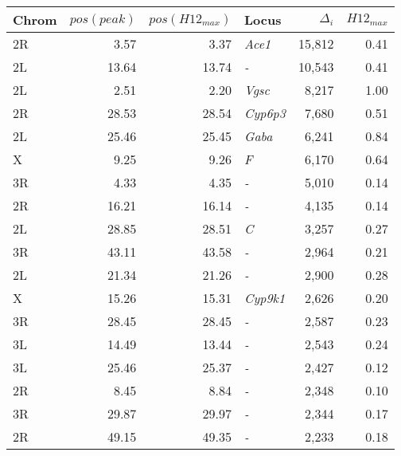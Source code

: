 \begin{tabular}{lrrlrr}
\toprule
Chrom & $pos(peak)$ & $pos(H12_{max})$ &            Locus & $\Delta_{i}$ & $H12_{max}$ \\
\midrule
   2R &        3.57 &             3.37 &    \textit{Ace1} &       15,812 &        0.41 \\
   2L &       13.64 &            13.74 &       \textit{-} &       10,543 &        0.41 \\
   2L &        2.51 &             2.20 &    \textit{Vgsc} &        8,217 &        1.00 \\
   2R &       28.53 &            28.54 &  \textit{Cyp6p3} &        7,680 &        0.51 \\
   2L &       25.46 &            25.45 &    \textit{Gaba} &        6,241 &        0.84 \\
    X &        9.25 &             9.26 &       \textit{F} &        6,170 &        0.64 \\
   3R &        4.33 &             4.35 &       \textit{-} &        5,010 &        0.14 \\
   2R &       16.21 &            16.14 &       \textit{-} &        4,135 &        0.14 \\
   2L &       28.85 &            28.51 &       \textit{C} &        3,257 &        0.27 \\
   3R &       43.11 &            43.58 &       \textit{-} &        2,964 &        0.21 \\
   2L &       21.34 &            21.26 &       \textit{-} &        2,900 &        0.28 \\
    X &       15.26 &            15.31 &  \textit{Cyp9k1} &        2,626 &        0.20 \\
   3R &       28.45 &            28.45 &       \textit{-} &        2,587 &        0.23 \\
   3L &       14.49 &            13.44 &       \textit{-} &        2,543 &        0.24 \\
   3L &       25.46 &            25.37 &       \textit{-} &        2,427 &        0.12 \\
   2R &        8.45 &             8.84 &       \textit{-} &        2,348 &        0.10 \\
   3R &       29.87 &            29.97 &       \textit{-} &        2,344 &        0.17 \\
   2R &       49.15 &            49.35 &       \textit{-} &        2,233 &        0.18 \\
\bottomrule
\end{tabular}
